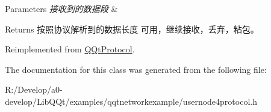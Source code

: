 \begin{DoxyParams}{Parameters}
{\em 接收到的数据段} & \\
\hline
\end{DoxyParams}
\begin{DoxyReturn}{Returns}
按照协议解析到的数据长度 可用，继续接收，丢弃，粘包。 
\end{DoxyReturn}


Reimplemented from \mbox{\hyperlink{class_q_qt_protocol_a00fd0c1ac23379ed3b9b25da9a34f39b}{Q\+Qt\+Protocol}}.



The documentation for this class was generated from the following file\+:\begin{DoxyCompactItemize}
\item 
R\+:/\+Develop/a0-\/develop/\+Lib\+Q\+Qt/examples/qqtnetworkexample/usernode4protocol.\+h\end{DoxyCompactItemize}
